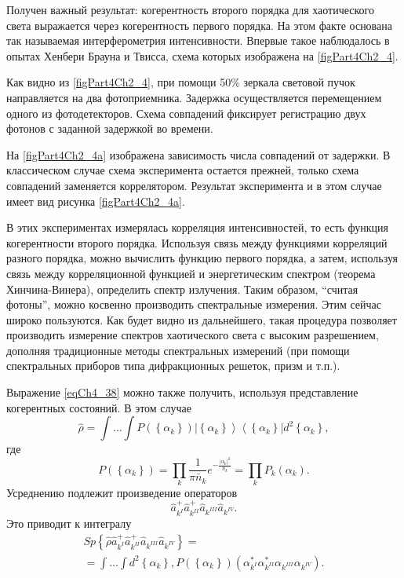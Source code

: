 Получен важный результат: когерентность второго порядка для
хаотического света выражается через когерентность первого порядка. На
этом факте основана так называемая интерферометрия
интенсивности. Впервые такое наблюдалось в опытах Хенбери Брауна и
Твисса, схема которых изображена на \autoref{figPart4Ch2_4}.



Как видно из \autoref{figPart4Ch2_4}, при помощи 50\% зеркала
световой пучок направляется на два фотоприемника. Задержка
осуществляется перемещением одного из фотодетекторов. Схема совпадений
фиксирует регистрацию двух фотонов с заданной задержкой во времени.



На \autoref{figPart4Ch2_4a} изображена зависимость числа совпадений
от задержки. В классическом случае схема эксперимента остается прежней,
только схема совпадений заменяется коррелятором. Результат
эксперимента и в этом случае имеет вид рисунка \ref{figPart4Ch2_4a}. 

В этих экспериментах измерялась корреляция интенсивностей, то есть 
функция когерентности второго порядка. Используя связь между функциями
корреляций разного порядка, можно вычислить функцию первого порядка, а
затем, используя связь между корреляционной функцией и энергетическим
спектром (теорема Хинчина-Винера), определить спектр излучения. Таким
образом, ``считая фотоны'', можно косвенно производить спектральные
измерения. Этим сейчас широко пользуются. Как будет видно из
дальнейшего, такая процедура позволяет производить измерение спектров
хаотического света с высоким разрешением, дополняя традиционные методы
спектральных измерений (при помощи спектральных приборов типа
дифракционных решеток, призм и т.п.). 

Выражение \eqref{eqCh4_38} можно также получить, используя
представление когерентных состояний. В этом случае
\begin{equation}
\hat{\rho} = \int \dots \int P\left(\left\{\alpha_k\right\}\right)
\left|\left\{\alpha_k\right\}\right>\left<\left\{\alpha_k\right\}\right|d^2 \left\{\alpha_k\right\},
\nonumber
\end{equation}
где
\begin{equation}
P\left(\left\{\alpha_k\right\}\right) = \prod_k\frac{1}{\pi
  \bar{n}_k}e^{-\frac{\left|\alpha_k\right|^2}{\bar{n}_k}}=
\prod_k P_k\left(\alpha_k\right).
\nonumber
\end{equation} 
Усреднению подлежит произведение операторов
\begin{equation}
\hat{a}^{+}_{k^{I}}\hat{a}^{+}_{k^{II}}\hat{a}_{k^{III}}\hat{a}_{k^{IV}}.
\nonumber
\end{equation}
Это приводит к интегралу
\begin{eqnarray}
Sp \left\{
\hat{\rho}
\hat{a}^{+}_{k^{I}}\hat{a}^{+}_{k^{II}}\hat{a}_{k^{III}}\hat{a}_{k^{IV}}
\right\} = 
\nonumber \\
= 
\int \dots \int 
d^2 \left\{\alpha_k\right\},
P\left(\left\{\alpha_k\right\}\right)
\left(
\alpha^{*}_{k^{I}}\alpha^{*}_{k^{II}}\alpha_{k^{III}}\alpha_{k^{IV}}
\right).
\nonumber
\end{eqnarray}

